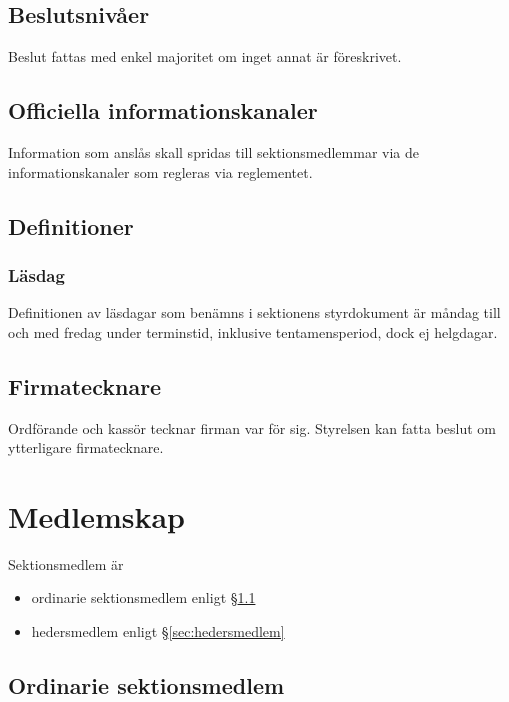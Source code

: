 \documentclass{dgovdoc}
\begin{document}
\subsection{Beslutsnivåer}

Beslut fattas med enkel majoritet om inget annat är föreskrivet.

\subsection{Officiella informationskanaler}
\label{sec:officiella_informationskanaler}

Information som anslås skall spridas till sektionsmedlemmar via de informationskanaler som regleras via reglementet.

\subsection{Definitioner}

\subsubsection{Läsdag}

Definitionen av läsdagar som benämns i sektionens styrdokument är
måndag till och med fredag under terminstid, inklusive tentamensperiod, dock ej helgdagar.

\subsection{Firmatecknare}

Ordförande och kassör tecknar firman var för sig. Styrelsen kan fatta beslut
om ytterligare firmatecknare. 

\section{Medlemskap}

Sektionsmedlem är

\begin{itemize}
  \item ordinarie sektionsmedlem enligt \S\ref{sec:ordinarie_sektionsmedlem}
  \item hedersmedlem enligt \S\ref{sec:hedersmedlem}
\end{itemize}

\subsection{Ordinarie sektionsmedlem}
\label{sec:ordinarie_sektionsmedlem}
\end{document}
